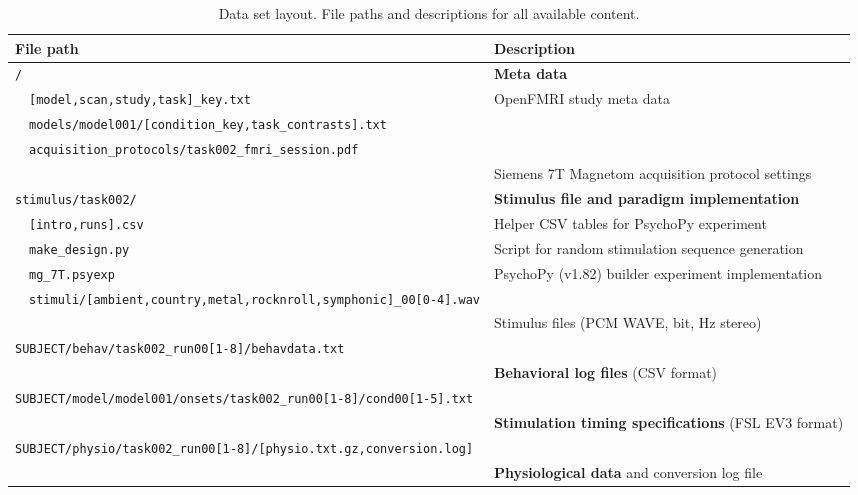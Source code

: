 \begin{table*}[p]
  \centering
  \caption{Data set layout. File paths and descriptions for all available content.}
  \begin{tabular}{p{2mm}p{65mm}p{95mm}}
    \toprule
    \multicolumn{2}{l}{\textbf{File path}} & \textbf{Description} \\
    \toprule
    \multicolumn{2}{l}{\texttt{/}} & \textbf{Meta data} \\
    & \texttt{[model,scan,study,task]\_key.txt} & OpenFMRI study meta data \\
    & \texttt{models/model001/[condition\_key,task\_contrasts].txt} & \\
    & \texttt{acquisition\_protocols/task002\_fmri\_session.pdf} \\
    & & Siemens 7T Magnetom acquisition protocol settings\\
    \midrule
    \multicolumn{2}{l}{\texttt{stimulus/task002/}} & \textbf{Stimulus file and paradigm implementation}\\
    & \texttt{[intro,runs].csv} & Helper CSV tables for PsychoPy experiment \\
    & \texttt{make\_design.py} & Script for random stimulation sequence generation \\
    & \texttt{mg\_7T.psyexp} & PsychoPy (v1.82) builder experiment implementation \\
    & \texttt{stimuli/[ambient,country,metal,rocknroll,symphonic]\_00[0-4].wav} \\
    & & Stimulus files (PCM WAVE, \unit[16]{bit}, \unit[44100]{Hz} stereo)\\

    \midrule
    \multicolumn{3}{l}{\texttt{SUBJECT/behav/task002\_run00[1-8]/behavdata.txt}} \\
    & & \textbf{Behavioral log files} (CSV format) \\
    \multicolumn{3}{l}{\texttt{SUBJECT/model/model001/onsets/task002\_run00[1-8]/cond00[1-5].txt}} \\
    & & \textbf{Stimulation timing specifications} (FSL EV3 format)\\

    \midrule
    \multicolumn{3}{l}{\texttt{SUBJECT/physio/task002\_run00[1-8]/[physio.txt.gz,conversion.log]}} \\
    & & \textbf{Physiological data} and conversion log file \\


\end{tabular}
\end{table*}
